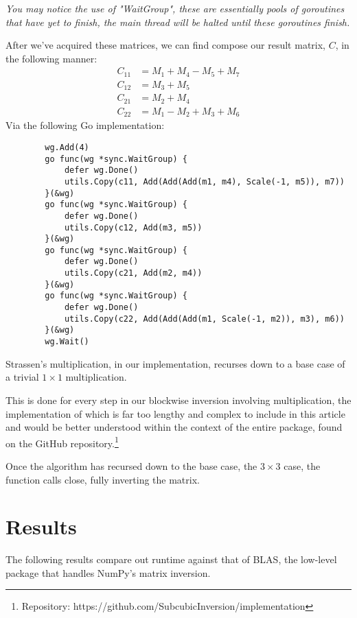 \documentclass[12pt, letterpaper]{article}
\theoremstyle{remark}
\theoremstyle{remark}
\begin{document}
    \textit{You may notice the use of "WaitGroup", these are essentially pools of 
    goroutines that have yet to finish, the main thread will be halted until 
    these goroutines finish.}

    \pagebreak

    After we've acquired these matrices, we can find compose our result matrix, \(C\), 
    in the following manner: 
    \begin{align*}
        C_{11} &= M_1 + M_4 - M_5 + M_7 \\
        C_{12} &= M_3 + M_5 \\
        C_{21} &= M_2 + M_4 \\
        C_{22} &= M_1 - M_2 + M_3 + M_6
    \end{align*}
    Via the following Go implementation:
    \begin{verbatim}
        wg.Add(4)
        go func(wg *sync.WaitGroup) {
            defer wg.Done()
            utils.Copy(c11, Add(Add(Add(m1, m4), Scale(-1, m5)), m7))
        }(&wg)
        go func(wg *sync.WaitGroup) {
            defer wg.Done()
            utils.Copy(c12, Add(m3, m5))
        }(&wg)
        go func(wg *sync.WaitGroup) {
            defer wg.Done()
            utils.Copy(c21, Add(m2, m4))
        }(&wg)
        go func(wg *sync.WaitGroup) {
            defer wg.Done()
            utils.Copy(c22, Add(Add(Add(m1, Scale(-1, m2)), m3), m6))
        }(&wg)
        wg.Wait()
    \end{verbatim}

    Strassen's multiplication, in our implementation, recurses down to a base case of a trivial \(1\times{1}\) 
    multiplication.

    This is done for every step in our blockwise inversion involving multiplication,
    the implementation of which is far too lengthy and complex to include in this article 
    and would be better understood within the context of the entire package, found on the GitHub repository.\footnote{Repository: https://github.com/SubcubicInversion/implementation}

    Once the algorithm has recursed down to the base case, the \(3\times{3}\) case, the function calls close, 
    fully inverting the matrix.

    \section{Results}

    The following results compare out runtime against that of BLAS, the low-level package
    that handles NumPy's matrix inversion.
\end{document}
